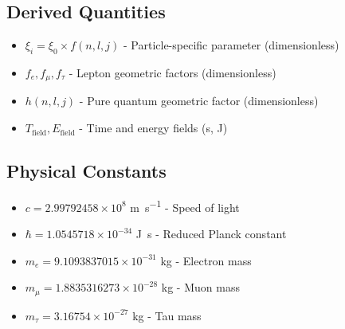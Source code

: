 \documentclass[12pt,a4paper]{article}
\newcommand{\xifunc}{f(n,l,j)}
\theoremstyle{definition}
\begin{document}
	\subsection{Derived Quantities}
	\begin{itemize}
		\item $\xi_i = \xi_0 \times \xifunc$ - Particle-specific parameter (dimensionless)
		\item $f_e, f_\mu, f_\tau$ - Lepton geometric factors (dimensionless)
		\item $h(n,l,j)$ - Pure quantum geometric factor (dimensionless)
		\item $T_{\text{field}}, E_{\text{field}}$ - Time and energy fields (\si{\second}, \si{\joule})
	\end{itemize}
	
	\subsection{Physical Constants}
	\begin{itemize}
		\item $c = 2.99792458 \times 10^8$ \si{\metre\per\second} - Speed of light
		\item $\hbar = 1.0545718 \times 10^{-34}$ \si{\joule\second} - Reduced Planck constant
		\item $m_e = 9.1093837015 \times 10^{-31}$ \si{\kilogram} - Electron mass
		\item $m_\mu = 1.8835316273 \times 10^{-28}$ \si{\kilogram} - Muon mass
		\item $m_\tau = 3.16754 \times 10^{-27}$ \si{\kilogram} - Tau mass
	\end{itemize}
	
\end{document}
